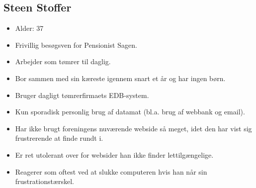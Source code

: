 \subsection{Steen Stoffer}
\begin{itemize}
    \item Alder: 37
    \item Frivillig besøgsven for Pensionist Sagen.
    \item Arbejder som tømrer til daglig.
    \item Bor sammen med sin kæreste igennem snart et år og har ingen børn.
    \item Bruger dagligt tømrerfirmaets EDB-system.
    \item Kun sporadisk personlig brug af datamat (bl.a. brug af webbank og email).
    \item Har ikke brugt foreningens nuværende webside så meget, idet den har vist sig frustrerende at finde rundt i.
    \item Er ret utolerant over for websider han ikke finder lettilgængelige.
    \item Reagerer som oftest ved at slukke computeren hvis han når sin frustrationstærskel.  
\end{itemize}
